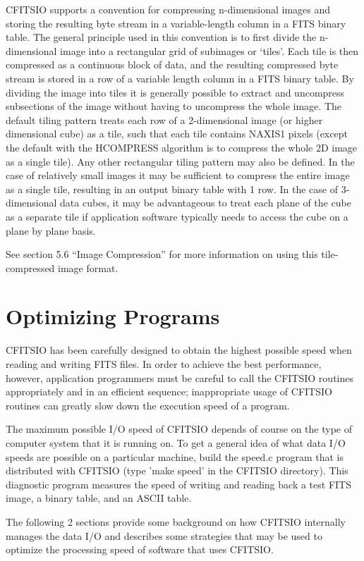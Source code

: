 \documentclass[11pt]{book}
\begin{document}
CFITSIO supports a convention for compressing n-dimensional images and
storing the resulting byte stream in a variable-length column in a FITS
binary table.  The general principle used in this convention is to
first divide the n-dimensional image into a rectangular grid of
subimages or `tiles'.  Each tile is then compressed as a continuous
block of data, and the resulting compressed byte stream is stored in a
row of a variable length column in a FITS binary table. By dividing the
image into tiles it is generally possible to extract and uncompress
subsections of the image without having to uncompress the whole image.
The default tiling pattern treats each row of a 2-dimensional image (or
higher dimensional cube) as a tile, such that each tile contains NAXIS1
pixels (except the default with the HCOMPRESS algorithm is to
compress the whole 2D image as a single tile). Any other rectangular
tiling pattern may also be defined. In
the case of relatively small images it may be sufficient to compress
the entire image as a single tile, resulting in an output binary table
with 1 row.  In the case of 3-dimensional data cubes, it may be
advantageous to treat each plane of the cube as a separate tile if
application software typically needs to access the cube on a plane by
plane basis.

See section 5.6 ``Image Compression''
for more information on using this tile-compressed image format.

\chapter{  Optimizing Programs }

CFITSIO has been carefully designed to obtain the highest possible
speed when reading and writing FITS files.  In order to achieve the
best performance, however, application programmers must be careful to
call the CFITSIO routines appropriately and in an efficient sequence;
inappropriate usage of CFITSIO routines can greatly slow down the
execution speed of a program.

The maximum possible I/O speed of CFITSIO depends of course on the type
of computer system that it is running on.  To get a general idea of what
data I/O speeds are possible on a particular machine, build the speed.c
program that is distributed with CFITSIO (type 'make speed' in the CFITSIO
directory).  This diagnostic program measures the speed of writing and reading
back a test FITS image, a binary table, and an ASCII table.

The following 2 sections provide some background on how CFITSIO
internally manages the data I/O and describes some strategies that may
be used to optimize the processing speed of software that uses
CFITSIO.
\end{document}
